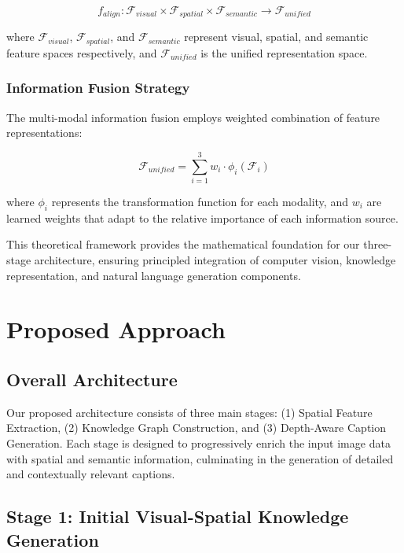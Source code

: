 \documentclass[runningheads,14pt]{llncs}
\begin{document}
\begin{equation}
f_{align}: \mathcal{F}_{visual} \times \mathcal{F}_{spatial} \times \mathcal{F}_{semantic} \rightarrow \mathcal{F}_{unified}
\end{equation}

where $\mathcal{F}_{visual}$, $\mathcal{F}_{spatial}$, and $\mathcal{F}_{semantic}$ represent visual, spatial, and semantic feature spaces respectively, and $\mathcal{F}_{unified}$ is the unified representation space.

\subsubsection{Information Fusion Strategy}
The multi-modal information fusion employs weighted combination of feature representations:

\begin{equation}
\mathcal{F}_{unified} = \sum_{i=1}^{3} w_i \cdot \phi_i(\mathcal{F}_i)
\end{equation}

where $\phi_i$ represents the transformation function for each modality, and $w_i$ are learned weights that adapt to the relative importance of each information source.

This theoretical framework provides the mathematical foundation for our three-stage architecture, ensuring principled integration of computer vision, knowledge representation, and natural language generation components.

\section{Proposed Approach}

\subsection{Overall Architecture}
Our proposed architecture consists of three main stages: (1) Spatial Feature Extraction, (2) Knowledge Graph Construction, and (3) Depth-Aware Caption Generation. 
Each stage is designed to progressively enrich the input image data with spatial and semantic information, culminating in the generation of detailed and contextually 
relevant captions.

\subsection{Stage 1: Initial Visual-Spatial Knowledge Generation}
\label{sec:stage1}
\end{document}
